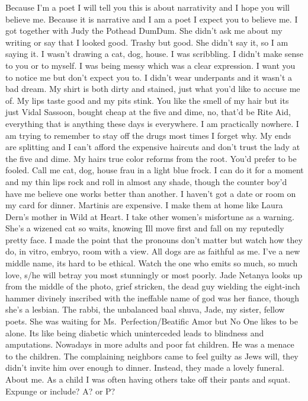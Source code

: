 Because I'm a poet I will tell you this is about narrativity and I hope
you will believe me. Because it is narrative and I am a poet I expect
you to believe me. I got together with Judy the Pothead DumDum. She
didn't ask me about my writing or say that I looked good. Trashy but
good. She didn't say it, so I am saying it. I wasn't drawing a cat, dog,
house. I was scribbling. I didn't make sense to you or to myself. I was
being messy which was a clear expression. I want you to notice me but
don't expect you to. I didn't wear underpants and it wasn't a bad dream.
My shirt is both dirty and stained, just what you'd like to accuse me
of. My lips taste good and my pits stink. You like the smell of my hair
but its just Vidal Sassoon, bought cheap at the five and dime, no,
that'd be Rite Aid, everything that is anything these days is
everywhere. I am practically nowhere. I am trying to remember to stay
off the drugs most times I forget why. My ends are splitting and I can't
afford the expensive haircuts and don't trust the lady at the five and
dime. My hairs true color reforms from the root. You'd prefer to be
fooled. Call me cat, dog, house frau in a light blue frock. I can do it
for a moment and my thin lips rock and roll in almost any shade, though
the counter boy'd have me believe one works better than another. I
haven't got a date or room on my card for dinner. Martinis are
expensive. I make them at home like Laura Dern's mother in Wild at
Heart. I take other women's misfortune as a warning. She's a wizened cat
so waits, knowing Ill move first and fall on my reputedly pretty face. I
made the point that the pronouns don't matter but watch how they do, in
vitro, embryo, room with a view. All dogs are as faithful as me. I've a
new middle name, its hard to be ethical. Watch the one who emits so
much, so much love, s/he will betray you most stunningly or most poorly.
Jade Netanya looks up from the middle of the photo, grief stricken, the
dead guy wielding the eight-inch hammer divinely inscribed with the
ineffable name of god was her fiance, though she's a lesbian. The rabbi,
the unbalanced baal shuva, Jade, my sister, fellow poets. She was
waiting for Ms.~Perfection/Beatific Amor but No One likes to be alone.
Its like being diabetic which uninterceded leads to blindness and
amputations. Nowadays in more adults and poor fat children. He was a
menace to the children. The complaining neighbors came to feel guilty as
Jews will, they didn't invite him over enough to dinner. Instead, they
made a lovely funeral. About me. As a child I was often having others
take off their pants and squat. Expunge or include? A? or P?

